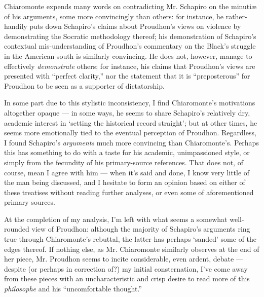 \documentclass[man]{apa}
\begin{document}
Chiaromonte expends many words on contradicting Mr. Schapiro on the minutiæ of his arguments, some more convincingly than others: for instance, he rather-handily puts down Schapiro's claims about Proudhon's views on violence by demonstrating the Socratic methodology thereof; his demonstration of Schapiro's contextual mis-understanding of Proudhon's commentary on the Black's struggle in the American south is similarly convincing. He does not, however, manage to effectively \emph{demonstrate} others; for instance, his claims that Proudhon's views are presented with “perfect clarity,” nor the statement that it is “preposterous” for Proudhon to be seen as a supporter of dictatorship.

In some part due to this stylistic inconsistency, I find Chiaromonte's motivations altogether opaque — in some ways, he seems to share Schapiro's relatively dry, academic interest in ‘setting the historical record straight’; but at other times, he seems more emotionally tied to the eventual perception of Proudhon. Regardless, I found Schapiro's \emph{arguments} much more convincing than Chiaromonte's. Perhaps this has something to do with a taste for his academic, unimpassioned style, or simply from the fecundity of his primary-source references. That does not, of course, mean I agree with him — when it's said and done, I know very little of the man being discussed, and I hesitate to form an opinion based on either of these treatises without reading further analyses, or even some of aforementioned primary sources.

At the completion of my analysis, I'm left with what seems a somewhat well-rounded view of Proudhon: although the majority of Schapiro's arguments ring true through Chiaromonte's rebuttal, the latter has perhaps ‘sanded’ some of the edges thereof. If nothing else, as Mr. Chiaromonte similarly observes at the end of her piece, Mr. Proudhon seems to incite considerable, even ardent, debate — despite (or perhaps in correction of?) my initial consternation, I've come away from these pieces with an uncharacteristic and crisp desire to read more of this \emph{philosophe} and his “uncomfortable thought.”
\end{document}
